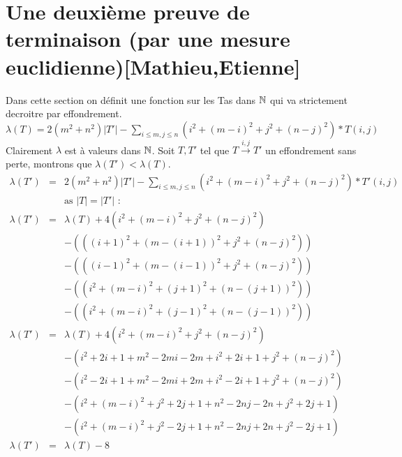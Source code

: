 \section{Une deuxième preuve de terminaison (par une mesure euclidienne)[Mathieu,Etienne]}

Dans cette section on définit une fonction sur les Tas dans $\mathbb{N}$ qui va strictement decroitre par effondrement.
\\$\lambda(T) = 2(m^2+n^2)|T'| - \sum_{i\leq m,j\leq n} (i^2 + (m-i)^2 + j^2 + (n-j)^2)*T(i,j)$
Clairement $\lambda$ est à valeurs dans $\mathbb{N}$.
Soit $T,T'$ tel que $T\xrightarrow{i,j}T'$ un effondrement sans perte,  montrons que $\lambda(T')<\lambda(T)$.
\begin{eqnarray*}
\lambda(T') & = & 2(m^2+n^2)|T'| - \sum_{i\leq m,j\leq n}(i^2 + (m-i)^2 + j^2 + (n-j)^2)*T'(i,j) \\
& & \mbox{as $|T| = |T'|$ :} \\
\lambda(T') & = & \lambda(T) + 4(i^2 + (m-i)^2 + j^2 + (n-j)^2) \\
& & - (((i+1)^2 + (m-(i+1))^2 + j^2 + (n-j)^2)) \\
& & - (((i-1)^2 + (m-(i-1))^2 + j^2 + (n-j)^2)) \\
& & - ((i^2 + (m-i)^2 + (j+1)^2 + (n-(j+1))^2)) \\
& & - ((i^2 + (m-i)^2 + (j-1)^2 + (n-(j-1))^2)) \\
\lambda(T') & = & \lambda(T) + 4(i^2 + (m-i)^2 + j^2 + (n-j)^2)\\
& & - (i^2 +2i +1  + m^2-2mi-2m + i^2 +2i +1 + j^2 + (n-j)^2) \\
& & - (i^2 -2i +1 + m^2-2mi+2m + i^2 -2i +1 + j^2 + (n-j)^2) \\
& & - (i^2 + (m-i)^2 + j^2+2j+1 + n^2-2nj-2n + j^2+2j+1) \\
& & - (i^2 + (m-i)^2 + j^2-2j+1 + n^2-2nj+2n + j^2-2j+1) \\
\lambda(T') & = & \lambda(T) - 8 \\
\end{eqnarray*}

